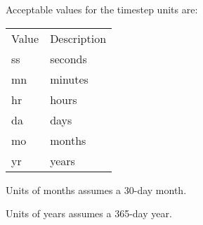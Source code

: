  Acceptable values for the timestep units are: 

 \begin{tabular}{ll}
 Value & Description \\
 ss    & seconds     \\
 mn    & minutes     \\
 hr    & hours       \\
 da    & days        \\
 mo    & months      \\
 yr    & years       \\
 \end{tabular}

 Units of months assumes a 30-day month.

 Units of years assumes a 365-day year.
 

